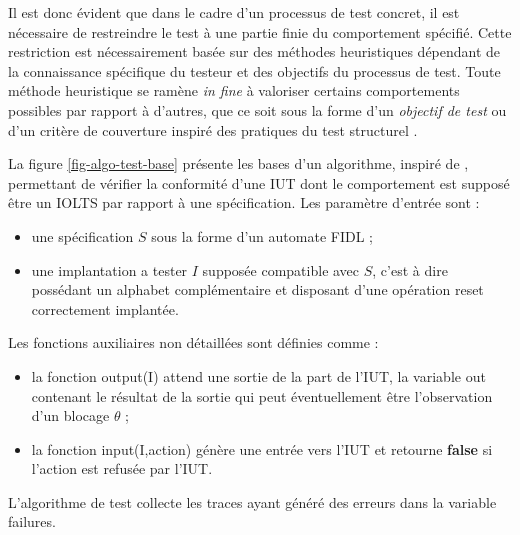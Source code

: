 Il est donc \'evident que dans le cadre d'un processus de test
concret, il est n\'ecessaire de restreindre le test \`a une partie
finie du comportement sp\'ecifi\'e. Cette restriction est
n\'ecessairement bas\'ee sur des m\'ethodes heuristiques
d\'ependant de la connaissance sp\'ecifique du testeur et des
objectifs du processus de test. Toute m\'ethode heuristique se
ram\`ene \emph{in fine} \`a valoriser certains comportements
possibles par rapport \`a d'autres, que ce soit sous la forme d'un
\emph{objectif de test}\cite{tgv,itu-z500,test-pf} ou d'un crit\`ere de couverture inspir\'e
des pratiques du test structurel
\cite{pyhala-test-selection,kervinen-heuristic,curgus-analytic-test,feijs-trace-distance}. 

La figure \ref{fig-algo-test-base} pr\'esente les bases d'un
algorithme, inspir\'e de \cite{pyhala-test-selection},  permettant de v\'erifier la conformit\'e d'une
\textsf{IUT} dont le comportement est suppos\'e \^etre un \textsf{IOLTS} par
rapport \`a une sp\'ecification.  Les param\`etre d'entr\'ee sont :
 \begin{itemize}
   \item une sp\'ecification $S$ sous la forme d'un automate
     \textsf{FIDL} ;
   \item une implantation a tester $I$ suppos\'ee compatible avec $S$,
     c'est \`a dire poss\'edant un alphabet compl\'ementaire et
     disposant d'une op\'eration \textsf{reset} correctement implant\'ee.
 \end{itemize}

Les fonctions auxiliaires non d\'etaill\'ees sont d\'efinies comme :
\begin{itemize}
  \item la fonction \textsf{output(I)} attend une sortie de la part de
    l'\textsf{IUT}, la variable \textsf{out} contenant le r\'esultat
    de la sortie qui peut \'eventuellement \^etre l'observation d'un
    blocage $\theta$ ;
  \item la fonction \textsf{input(I,action)} g\'en\`ere une
  entr\'ee vers l'\textsf{IUT} et retourne \textbf{false} si l'action
  est refus\'ee par l'\textsf{IUT}.
\end{itemize}
L'algorithme de test collecte les traces ayant g\'en\'er\'e des
erreurs dans la variable \textsf{failures}.

